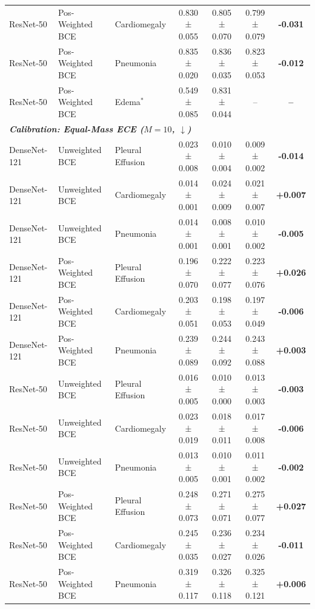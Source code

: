 \begin{table}[t]
{\begin{tabular}{lllcccc}
ResNet-50 & Pos-Weighted BCE & Cardiomegaly & 0.830 ± 0.055 & 0.805 ± 0.070 & 0.799 ± 0.079 & \textbf{-0.031} \\
ResNet-50 & Pos-Weighted BCE & Pneumonia & 0.835 ± 0.020 & 0.836 ± 0.035 & 0.823 ± 0.053 & \textbf{-0.012} \\
ResNet-50 & Pos-Weighted BCE & Edema$^*$ & 0.549 ± 0.085 & 0.831 ± 0.044 & -- & \textbf{--} \\
\hline
\multicolumn{7}{l}{\textit{\textbf{Calibration: Equal-Mass ECE ($M=10$, $\downarrow$)}}} \\
DenseNet-121 & Unweighted BCE & Pleural Effusion & 0.023 ± 0.008 & 0.010 ± 0.004 & 0.009 ± 0.002 & \textbf{-0.014} \\
DenseNet-121 & Unweighted BCE & Cardiomegaly & 0.014 ± 0.001 & 0.024 ± 0.009 & 0.021 ± 0.007 & \textbf{+0.007} \\
DenseNet-121 & Unweighted BCE & Pneumonia & 0.014 ± 0.001 & 0.008 ± 0.001 & 0.010 ± 0.002 & \textbf{-0.005} \\
DenseNet-121 & Pos-Weighted BCE & Pleural Effusion & 0.196 ± 0.070 & 0.222 ± 0.077 & 0.223 ± 0.076 & \textbf{+0.026} \\
DenseNet-121 & Pos-Weighted BCE & Cardiomegaly & 0.203 ± 0.051 & 0.198 ± 0.053 & 0.197 ± 0.049 & \textbf{-0.006} \\
DenseNet-121 & Pos-Weighted BCE & Pneumonia & 0.239 ± 0.089 & 0.244 ± 0.092 & 0.243 ± 0.088 & \textbf{+0.003} \\
ResNet-50 & Unweighted BCE & Pleural Effusion & 0.016 ± 0.005 & 0.010 ± 0.000 & 0.013 ± 0.003 & \textbf{-0.003} \\
ResNet-50 & Unweighted BCE & Cardiomegaly & 0.023 ± 0.019 & 0.018 ± 0.011 & 0.017 ± 0.008 & \textbf{-0.006} \\
ResNet-50 & Unweighted BCE & Pneumonia & 0.013 ± 0.005 & 0.010 ± 0.001 & 0.011 ± 0.002 & \textbf{-0.002} \\
ResNet-50 & Pos-Weighted BCE & Pleural Effusion & 0.248 ± 0.073 & 0.271 ± 0.071 & 0.275 ± 0.077 & \textbf{+0.027} \\
ResNet-50 & Pos-Weighted BCE & Cardiomegaly & 0.245 ± 0.035 & 0.236 ± 0.027 & 0.234 ± 0.026 & \textbf{-0.011} \\
ResNet-50 & Pos-Weighted BCE & Pneumonia & 0.319 ± 0.117 & 0.326 ± 0.118 & 0.325 ± 0.121 & \textbf{+0.006} \\
\hline
\end{tabular}
}
\end{table}